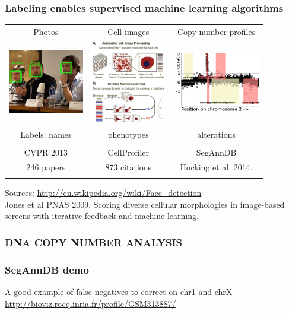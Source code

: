 \documentclass{beamer}
\begin{document}
\begin{frame}
  \frametitle{Labeling enables supervised machine learning algorithms}
  \begin{tabular}{ccc}
    Photos & Cell images & Copy number profiles \\
    \includegraphics[width=1.3in]{faces} &
    \includegraphics[width=1.3in]{cellprofiler} &
    \includegraphics[width=1.5in]{regions-axes}\\
    Labels: names & phenotypes & alterations \\ \\
    CVPR 2013 & CellProfiler & SegAnnDB \\
    246 papers & 873 citations & Hocking et al, 2014. \\
     &
  \end{tabular}
  Sources: \url{http://en.wikipedia.org/wiki/Face_detection}\\
  Jones et al PNAS 2009. Scoring diverse cellular morphologies in
  image-based screens with iterative feedback and machine learning.
\end{frame}

\begin{frame}
  \frametitle{DNA COPY NUMBER ANALYSIS}
\end{frame}

\begin{frame}
  \frametitle{SegAnnDB demo}
    A good example of false negatives to correct on chr1 and chrX
  \url{http://bioviz.rocq.inria.fr/profile/GSM313887/}
\end{frame}
\end{document}
